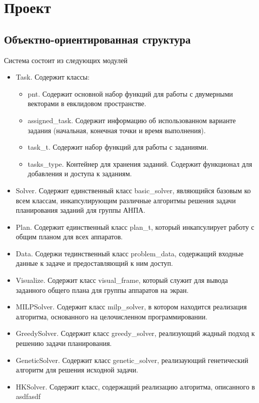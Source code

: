 \documentclass[a4paper,14pt,russian]{article}
\begin{document}

\section{Проект}
\subsection{Объектно-ориентированная структура}
Система состоит из следующих модулей
\begin{itemize}
\item Task. Содержит классы:
    \begin{itemize}
    \item pnt. Содержит основной набор функций для работы с двумерными векторами в евклидовом пространстве. %
    \item assigned\_task. Содержит информацию об использованном варианте задания (начальная, конечная точки и время выполнения). %
    \item task\_t. Содержит набор функций для работы с заданиями.
    \item tasks\_type. Контейнер для хранения заданий. Содержит функционал для добавления и доступа к заданиям.
    \end{itemize}
\item Solver. Содержит единственный класс basic\_solver, являющийся базовым ко всем классам, инкапсулирующим различные алгоритмы решения задачи планирования заданий для группы АНПА.
\item Plan. Содержит единственный класс plan\_t, который инкапсулирует работу с общим планом для всех аппаратов.
\item Data. Содержи тединственный класс problem\_data, содержащий входные данные к задаче и предоставляющий к ним доступ.
\item Visualize. Содержит класс visual\_frame, который служит для вывода заданного общего плана для группы аппаратов на экран.
\item MILPSolver. Содержит класс milp\_solver, в котором находится реализация алгоритма, основанного на целочисленном программировании.
\item GreedySolver. Содержит класс greedy\_solver, реализующий жадный подход к решению задачи планирования.
\item GeneticSolver. Содержит класс genetic\_solver, реализаующий генетический алгоритм для решения исходной задачи.
\item HKSolver. Содержит класс, содержащий реализацию алгоритма, описанного в asdfasdf
\end{itemize}
\end{document}
